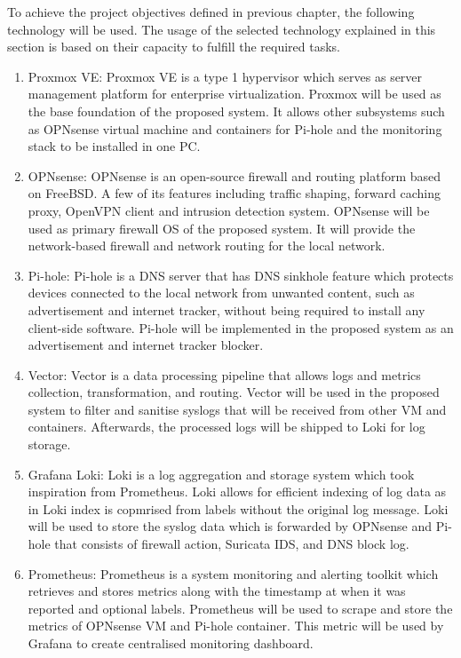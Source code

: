 \documentclass[conference]{IEEEtran}
\begin{document}
To achieve the project objectives defined in previous chapter, the following technology will be
used. The usage of the selected technology explained in this section is based on their capacity to
fulfill the required tasks.

\begin{enumerate}

  \item Proxmox VE: Proxmox VE is a type 1 hypervisor which serves as server management platform for
    enterprise virtualization. Proxmox will be used as the base foundation of the proposed system.
    It allows other subsystems such as OPNsense virtual machine and containers for Pi-hole and the
    monitoring stack to be installed in one PC.

  \item OPNsense: OPNsense is an open-source firewall and routing platform based on FreeBSD. A few
    of its features including traffic shaping, forward caching proxy, OpenVPN client and intrusion
    detection system. OPNsense will be used as primary firewall OS of the proposed system. It will
    provide the network-based firewall and network routing for the local network. 

  \item Pi-hole: Pi-hole is a DNS server that has DNS sinkhole feature which protects devices
    connected to the local network from unwanted content, such as advertisement and internet
    tracker, without being required to install any client-side software. Pi-hole will be implemented
    in the proposed system as an advertisement and internet tracker blocker.

  \item Vector: Vector is a data processing pipeline that allows logs and metrics collection,
    transformation, and routing. Vector will be used in the proposed system to filter and sanitise
    syslogs that will be received from other VM and containers. Afterwards, the processed logs will
    be shipped to Loki for log storage.

  \item Grafana Loki: Loki is a log aggregation and storage system which took inspiration from
    Prometheus. Loki allows for efficient indexing of log data as in Loki index is copmrised from
    labels without the original log message. Loki will be used to store the syslog data which is
    forwarded by OPNsense and Pi-hole that consists of firewall action, Suricata IDS, and DNS block
    log.

  \item Prometheus: Prometheus is a system monitoring and alerting toolkit which retrieves and
    stores metrics along with the timestamp at when it was reported and optional labels. Prometheus
    will be used to scrape and store the metrics of OPNsense VM and Pi-hole container. This metric
    will be used by Grafana to create centralised monitoring dashboard.


\end{enumerate}
\end{document}
